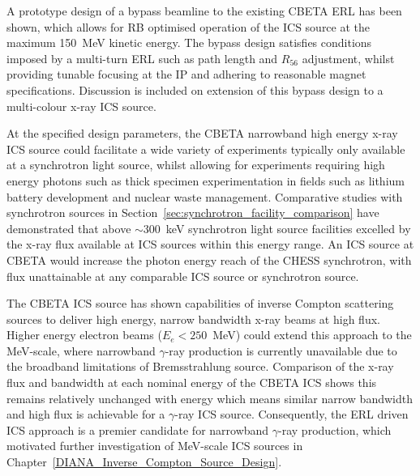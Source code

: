 \documentclass[../main.tex]{subfiles}
\begin{document}
A prototype design of a bypass beamline to the existing CBETA ERL has been shown, which allows for RB optimised operation of the ICS source at the maximum 150~\si{\mega\electronvolt} kinetic energy. The bypass design satisfies conditions imposed by a multi-turn ERL such as path length and $R_{56}$ adjustment, whilst providing tunable focusing at the IP and adhering to reasonable magnet specifications. Discussion is included on extension of this bypass design to a multi-colour x-ray ICS source.  

At the specified design parameters, the CBETA narrowband high energy x-ray ICS source could facilitate a wide variety of experiments typically only available at a synchrotron light source, whilst allowing for experiments requiring high energy photons such as thick specimen experimentation in fields such as lithium battery development and nuclear waste management. Comparative studies with synchrotron sources in Section~\ref{sec:synchrotron_facility_comparison} have demonstrated that above $\sim300$~\si{\kilo\electronvolt} synchrotron light source facilities excelled by the x-ray flux available at ICS sources within this energy range. An ICS source at CBETA would increase the photon energy reach of the CHESS \cite{CHESSstructuralmaterialsbeamline} synchrotron, with flux unattainable at any comparable ICS source or synchrotron source.  

The CBETA ICS source has shown capabilities of inverse Compton scattering sources to deliver high energy, narrow bandwidth x-ray beams
at high flux. Higher energy electron beams ($E_{e}<250$~\si{\mega\electronvolt}) could extend this approach to the \si{\mega\electronvolt}-scale, where narrowband $\gamma$-ray production is currently unavailable due to the broadband limitations of Bremsstrahlung source. Comparison of the x-ray flux and bandwidth at each nominal energy of the CBETA ICS shows this remains relatively unchanged with energy which means similar narrow bandwidth and high flux is achievable for a $\gamma$-ray ICS source. Consequently, the ERL driven ICS approach is a premier candidate for narrowband $\gamma$-ray production, which motivated further investigation of \si{\mega\electronvolt}-scale ICS sources in Chapter~\ref{DIANA_Inverse_Compton_Source_Design}.
\end{document}
